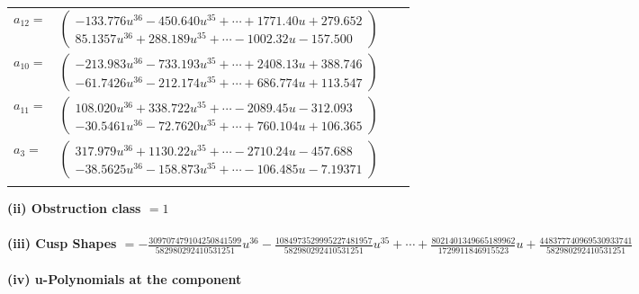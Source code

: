 \documentclass[1p]{elsarticle_modified}
\theoremstyle{definition}
\begin{document}
\begin{tabular}{m{7pt} m{180pt} m{7pt} m{180pt} }
\flushright $a_{12}=$&$\begin{pmatrix}-133.776 u^{36}-450.640 u^{35}+\cdots+1771.40 u+279.652\\85.1357 u^{36}+288.189 u^{35}+\cdots-1002.32 u-157.500\end{pmatrix}$ \\
\flushright $a_{10}=$&$\begin{pmatrix}-213.983 u^{36}-733.193 u^{35}+\cdots+2408.13 u+388.746\\-61.7426 u^{36}-212.174 u^{35}+\cdots+686.774 u+113.547\end{pmatrix}$ \\
\flushright $a_{11}=$&$\begin{pmatrix}108.020 u^{36}+338.722 u^{35}+\cdots-2089.45 u-312.093\\-30.5461 u^{36}-72.7620 u^{35}+\cdots+760.104 u+106.365\end{pmatrix}$ \\
\flushright $a_{3}=$&$\begin{pmatrix}317.979 u^{36}+1130.22 u^{35}+\cdots-2710.24 u-457.688\\-38.5625 u^{36}-158.873 u^{35}+\cdots-106.485 u-7.19371\end{pmatrix}$\\&\end{tabular}
\flushleft \textbf{(ii) Obstruction class $= 1$}\\~\\
\flushleft \textbf{(iii) Cusp Shapes $= -\frac{309707479104250841599}{582980292410531251} u^{36}-\frac{1084973529995227481957}{582980292410531251} u^{35}+\cdots+\frac{8021401349665189962}{1729911846915523} u+\frac{448377740969530933741}{582980292410531251}$}\\~\\
\newpage\renewcommand{\arraystretch}{1}
\flushleft \textbf{(iv) u-Polynomials at the component}\newline \\
\end{document}
